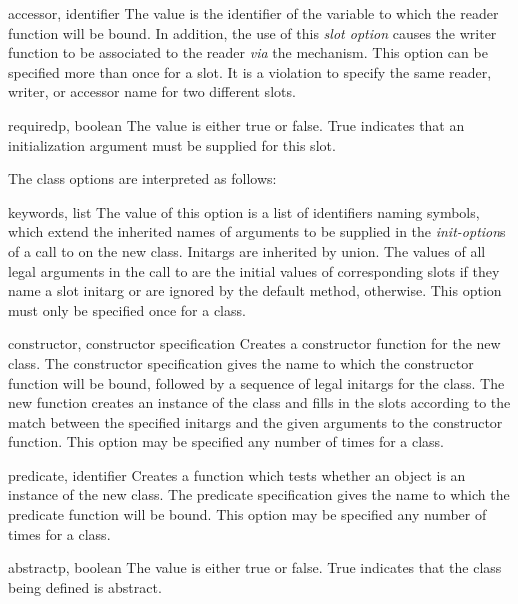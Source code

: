 \begin{optDefinition}
\begin{options}
    \item[accessor, identifier]%
    The value is the identifier of the variable to which the reader function
    will be bound. In addition, the use of this {\em slot option\/} causes the
    writer function to be associated to the reader {\em via\/} the
     mechanism. This option can be specified more than once
    for a slot. It is a violation to specify the same reader, writer, or
    accessor name for two different slots.

    \item[requiredp, boolean]%
    The value is either true or false. True indicates that an initialization
    argument must be supplied for this slot.
\end{options}
%
The class options are interpreted as follows:
%
\begin{options}
    \item[keywords, list]%
    The value of this option is a list of identifiers naming symbols, which
    extend the inherited names of arguments to be supplied in the {\em
        init-option\/}s of a call to  on the new
    class. Initargs are inherited by union. The values of all legal arguments in
    the call to  are the initial values of corresponding slots
    if they name a slot initarg or are ignored by the default
     method, otherwise. This option must only be
    specified once for a class.

    \item[constructor, constructor specification]%
    Creates a constructor function for the new class.  The constructor
    specification gives the name to which the constructor function will be
    bound, followed by a sequence of legal initargs for the class.  The new
    function creates an instance of the class and fills in the slots according
    to the match between the specified initargs and the given arguments to the
    constructor function.  This option may be specified any number of times for
    a class.

    \item[predicate, identifier]%
    Creates a function which tests whether an object is an instance of the new
    class.  The predicate specification gives the name to which the predicate
    function will be bound.  This option may be specified any number of times
    for a class.

    \item[abstractp, boolean]%
    The value is either true or false. True indicates that the class being
    defined is abstract.
%
\end{options}
%
\end{optDefinition}
